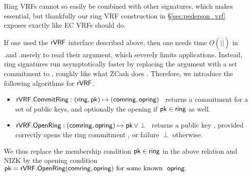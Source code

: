 Ring VRFs cannot so easily be combined with other signatures, which
makes \aux essential,%
but thankfully our ring VRF construction in \S\ref{sec:pederson_vrf} exposes \aux exactly like EC VRFs should do.%


If one used the ${\mathsf{rVRF}}$ interface described above, then one needs time
$O(|\ring|)$ in \rVRF.\rSign and \rVRF.\rVerify merely to read their \ring
argument, which severely limits applications.
Instead, ring signatures run asymptotically faster by replacing the \ring
argument with a set commitment to \ring, roughly like what ZCash does \cite{zcash_protocol}. Therefore, we introduce the following algorithms for $ {\mathsf{rVRF}} $.
\begin{itemize}
\item ${\mathsf{rVRF}}.{\mathsf{CommitRing}} : (\mathsf{ring},\mathsf{pk}) \mapsto (\mathsf{comring},\mathsf{opring})$ \,
    returns a commitment for a set \ring of public keys, and
    optionally the opening \openring if $\mathsf{pk} \in \mathsf{ring}$ as well.
\item ${\mathsf{rVRF}}.{\mathsf{OpenRing}} : (\mathsf{comring},\mathsf{opring}) \mapsto \mathsf{pk} \, \lor \perp$ \,
    returns a public key \pk, provided \openring correctly opens
    the ring commitment \comring, or failure $\perp$ otherwise.
\end{itemize}

We thus replace the membership condition $\mathsf{pk} \in \mathsf{ring}$ in the above
relation and NIZK by the opening condition
$ \mathsf{pk} = {\mathsf{rVRF}}.{\mathsf{OpenRing}}(\mathsf{comring},\mathsf{opring}) \textrm{\ for some known \ } \mathsf{opring} . $
%

